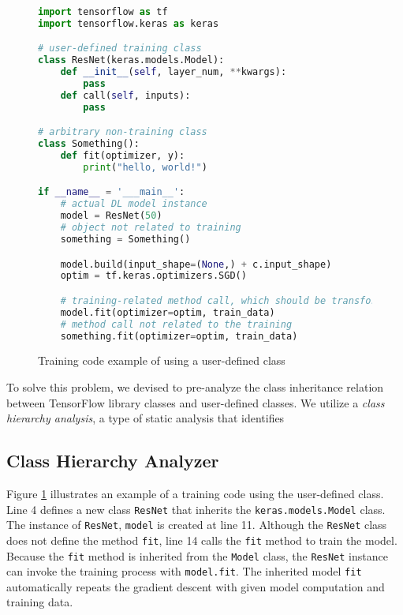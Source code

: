 \begin{figure}[h]
  \begin{lstlisting}[language=Python]
import tensorflow as tf
import tensorflow.keras as keras

# user-defined training class
class ResNet(keras.models.Model): 
    def __init__(self, layer_num, **kwargs):
        pass
    def call(self, inputs):
        pass

# arbitrary non-training class 
class Something():
    def fit(optimizer, y):
        print("hello, world!") 

if __name__ = '___main__': 
    # actual DL model instance
    model = ResNet(50)
    # object not related to training
    something = Something()

    model.build(input_shape=(None,) + c.input_shape) 
    optim = tf.keras.optimizers.SGD()

    # training-related method call, which should be transformed
    model.fit(optimizer=optim, train_data) 
    # method call not related to the training  
    something.fit(optimizer=optim, train_data)
\end{lstlisting}
\caption{Training code example of using a user-defined class}
\label{fig:cha:ex}
\end{figure}

To solve this problem, we devised to pre-analyze the class inheritance
relation between TensorFlow library classes and user-defined classes. 
We utilize a \textit{class hierarchy analysis}, a type of static analysis
that identifies   


\subsection{Class Hierarchy Analyzer}



Figure \ref{fig:cha:ex} illustrates an example of a training code
using the user-defined class. 
Line 4 defines a new class {\tt ResNet} that inherits the  
{\tt keras.models.Model} class. The instance of {\tt ResNet}, {\tt model}
is created at line 11. Although the {\tt ResNet} class does not define
the method {\tt fit}, line 14 calls the {\tt fit} method to train the model.
Because the {\tt fit} method is inherited from the {\tt Model} class,
the {\tt ResNet} instance can invoke the training process with
{\tt model.fit}. The inherited model {\tt fit}
automatically repeats the gradient descent with
given model computation and training data. 

